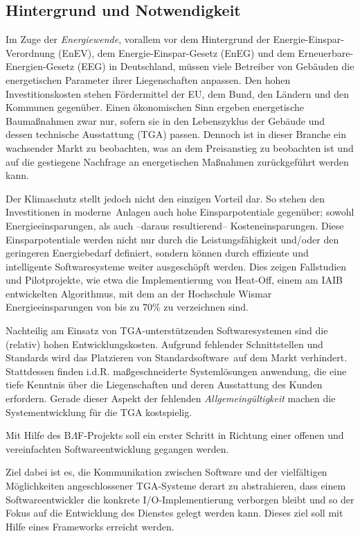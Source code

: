\documentclass{hswpaper}
\newcommand{\NAME}{B$\Lambda$F}
\begin{document}
\subsection{Hintergrund und Notwendigkeit}
Im Zuge der \emph{Energiewende}, vorallem vor dem Hintergrund der Energie-Einspar-Verordnung (EnEV), dem Energie-Einspar-Gesetz (EnEG) und dem Erneuerbare-Energien-Gesetz (EEG) in Deutschland, müssen viele Betreiber von Gebäuden die energetischen Parameter ihrer Liegenschaften anpassen. Den hohen Investitionskosten stehen Fördermittel der EU, dem Bund, den Ländern und den Kommunen gegenüber. Einen ökonomischen Sinn ergeben energetische Baumaßnahmen zwar nur, sofern sie in den Lebenszyklus der Gebäude und dessen technische Ausstattung (TGA) passen. Dennoch ist in dieser Branche ein wachsender Markt zu beobachten, was an dem Preisanstieg zu beobachten ist und auf die gestiegene Nachfrage an energetischen Maßnahmen zurückgeführt werden kann.\par Der Klimaschutz stellt jedoch nicht den einzigen Vorteil dar. So stehen den Investitionen in \glqq moderne\grqq\ Anlagen auch hohe Einsparpotentiale gegenüber; sowohl Energieeinsparungen, als auch --daraus resultierend-- Kosteneinsparungen. Diese Einsparpotentiale werden nicht nur durch die Leistungsfähigkeit und/oder den geringeren Energiebedarf definiert, sondern können durch effiziente und intelligente Softwaresysteme weiter ausgeschöpft werden. Dies zeigen Fallstudien und Pilotprojekte, wie etwa die Implementierung von \glqq Heat-Off\grqq , einem am IAIB entwickelten Algorithmus, mit dem an der Hochschule Wismar Energieeinsparungen von bis zu 70{}\% zu verzeichnen sind.\par Nachteilig am Einsatz von TGA-unterstützenden Softwaresystemen sind die (relativ) hohen Entwicklungskosten. Aufgrund fehlender Schnittstellen und Standards wird das Platzieren von \glqq Standardsoftware\grqq\ auf dem Markt verhindert. Stattdessen finden i.d.R. maßgeschneiderte Systemlösungen anwendung, die eine tiefe Kenntnis über die Liegenschaften und deren Ausstattung des Kunden erfordern. Gerade dieser Aspekt der fehlenden \emph{Allgemeingültigkeit} machen die Systementwicklung für die TGA kostspielig.\par Mit Hilfe des \NAME -Projekts soll ein erster Schritt in Richtung einer offenen und vereinfachten Softwareentwicklung gegangen werden.\par Ziel dabei ist es, die Kommunikation zwischen Software und der vielfältigen Möglichkeiten angeschlossener TGA-Systeme derart zu abstrahieren, dass einem Softwareentwickler die konkrete I/O-Implementierung verborgen bleibt und so der Fokus auf die Entwicklung des Dienstes gelegt werden kann. Dieses ziel soll mit Hilfe eines Frameworks erreicht werden.
\end{document}
